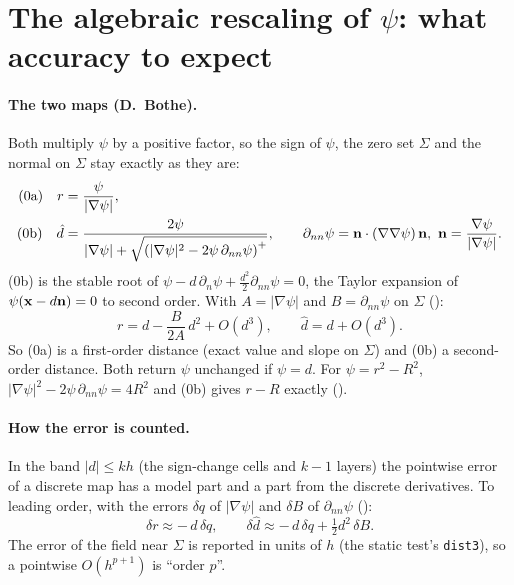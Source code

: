 \section{The algebraic rescaling of $\psi$: what accuracy to expect}
\label{sec:rescaling}

\paragraph{The two maps (D.~Bothe).} Both multiply $\psi$ by a positive factor, so the sign of
$\psi$, the zero set $\Sigma$ and the normal on $\Sigma$ stay exactly as they are:
\begin{align}
  \text{(0a)}\quad r &= \frac{\psi}{|\nabla\psi|}, \label{eq:r}\\
  \text{(0b)}\quad \hat d &= \frac{2\psi}{|\nabla\psi| +
     \sqrt{\left(|\nabla\psi|^2 - 2\psi\,\partial_{nn}\psi\right)^+}},
  \qquad \partial_{nn}\psi = \bn\cdot(\nabla\nabla\psi)\,\bn,\ \bn=\frac{\nabla\psi}{|\nabla\psi|}.
  \label{eq:dhat}
\end{align}
(0b) is the stable root of $\psi-d\,\partial_n\psi+\tfrac{d^2}{2}\partial_{nn}\psi=0$, the
Taylor expansion of $\psi(\mathbf{x}-d\mathbf{n})=0$ to second order. With $A=|\nabla\psi|$ and
$B=\partial_{nn}\psi$ on $\Sigma$ (\Der):
\begin{equation}
  r = d - \frac{B}{2A}\,d^2 + O(d^3), \qquad \hat d = d + O(d^3).
\end{equation}
So (0a) is a first-order distance (exact value and slope on $\Sigma$) and (0b) a second-order
distance. Both return $\psi$ unchanged if $\psi=d$. For $\psi=r^2-R^2$,
$|\nabla\psi|^2-2\psi\,\partial_{nn}\psi=4R^2$ and (0b) gives $r-R$ exactly (\Der).

\paragraph{How the error is counted.} In the band $|d|\le kh$ (the sign-change cells and $k-1$
layers) the pointwise error of a discrete map has a model part and a part from the discrete
derivatives. To leading order, with the errors $\delta q$ of $|\nabla\psi|$ and $\delta B$ of
$\partial_{nn}\psi$ (\Der):
\begin{equation}
  \delta r \approx -\,d\,\delta q, \qquad
  \delta\hat d \approx -\,d\,\delta q + \tfrac12 d^2\,\delta B .
  \label{eq:derr}
\end{equation}
The error of the field near $\Sigma$ is reported in units of $h$ (the static test's
\texttt{dist3}), so a pointwise $O(h^{p+1})$ is ``order $p$''.

